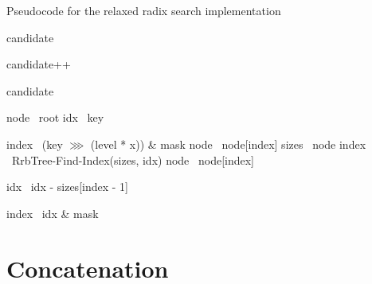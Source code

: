 \begin{listing}[ht!]
    \caption{Pseudocode for the relaxed radix search implementation}
    \label{lst:rrb-tree-relaxed-radix-search}

    \begin{algorithmic}
            \State candidate 

                \State candidate++
            \EndIf

            \State \Return candidate
        \EndFunction

        \State

            \State node \la\ root
            \State idx \la\ key

                    \State index \la\ (key $\ggg$ (level * x)) \& mask
                    \State node \la\ node[index]
                \Else
                    \State sizes \la\ node
                    \State index \la\ RrbTree-Find-Index(sizes, idx)
                    \State node \la\ node[index]

                        \State idx \la\ idx - sizes[index - 1]
                    \EndIf
                \EndIf
            \EndFor

            \State index \la\ idx \& mask
            \State {}
        \EndFunction
    \end{algorithmic}
\end{listing}

\section{Concatenation}

